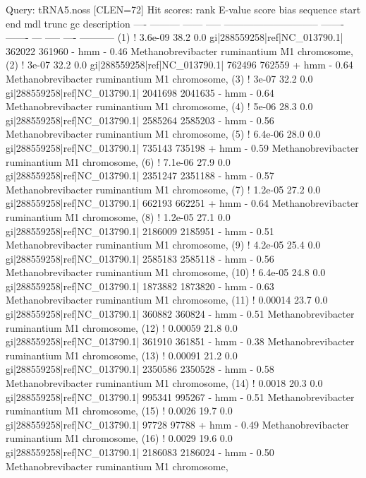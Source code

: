\begin{sreoutput}
Query:       tRNA5.noss  [CLEN=72]
Hit scores:
 rank     E-value  score  bias  sequence                        start     end   mdl trunc   gc  description
 ----   --------- ------ -----  ----------------------------- ------- -------   --- ----- ----  -----------
  (1) !   3.6e-09   38.2   0.0  gi|288559258|ref|NC_013790.1|  362022  361960 - hmm     - 0.46  Methanobrevibacter ruminantium M1 chromosome, 
  (2) !     3e-07   32.2   0.0  gi|288559258|ref|NC_013790.1|  762496  762559 + hmm     - 0.64  Methanobrevibacter ruminantium M1 chromosome, 
  (3) !     3e-07   32.2   0.0  gi|288559258|ref|NC_013790.1| 2041698 2041635 - hmm     - 0.64  Methanobrevibacter ruminantium M1 chromosome, 
  (4) !     5e-06   28.3   0.0  gi|288559258|ref|NC_013790.1| 2585264 2585203 - hmm     - 0.56  Methanobrevibacter ruminantium M1 chromosome, 
  (5) !   6.4e-06   28.0   0.0  gi|288559258|ref|NC_013790.1|  735143  735198 + hmm     - 0.59  Methanobrevibacter ruminantium M1 chromosome, 
  (6) !   7.1e-06   27.9   0.0  gi|288559258|ref|NC_013790.1| 2351247 2351188 - hmm     - 0.57  Methanobrevibacter ruminantium M1 chromosome, 
  (7) !   1.2e-05   27.2   0.0  gi|288559258|ref|NC_013790.1|  662193  662251 + hmm     - 0.64  Methanobrevibacter ruminantium M1 chromosome, 
  (8) !   1.2e-05   27.1   0.0  gi|288559258|ref|NC_013790.1| 2186009 2185951 - hmm     - 0.51  Methanobrevibacter ruminantium M1 chromosome, 
  (9) !   4.2e-05   25.4   0.0  gi|288559258|ref|NC_013790.1| 2585183 2585118 - hmm     - 0.56  Methanobrevibacter ruminantium M1 chromosome, 
 (10) !   6.4e-05   24.8   0.0  gi|288559258|ref|NC_013790.1| 1873882 1873820 - hmm     - 0.63  Methanobrevibacter ruminantium M1 chromosome, 
 (11) !   0.00014   23.7   0.0  gi|288559258|ref|NC_013790.1|  360882  360824 - hmm     - 0.51  Methanobrevibacter ruminantium M1 chromosome, 
 (12) !   0.00059   21.8   0.0  gi|288559258|ref|NC_013790.1|  361910  361851 - hmm     - 0.38  Methanobrevibacter ruminantium M1 chromosome, 
 (13) !   0.00091   21.2   0.0  gi|288559258|ref|NC_013790.1| 2350586 2350528 - hmm     - 0.58  Methanobrevibacter ruminantium M1 chromosome, 
 (14) !    0.0018   20.3   0.0  gi|288559258|ref|NC_013790.1|  995341  995267 - hmm     - 0.51  Methanobrevibacter ruminantium M1 chromosome, 
 (15) !    0.0026   19.7   0.0  gi|288559258|ref|NC_013790.1|   97728   97788 + hmm     - 0.49  Methanobrevibacter ruminantium M1 chromosome, 
 (16) !    0.0029   19.6   0.0  gi|288559258|ref|NC_013790.1| 2186083 2186024 - hmm     - 0.50  Methanobrevibacter ruminantium M1 chromosome, 

\end{sreoutput}
